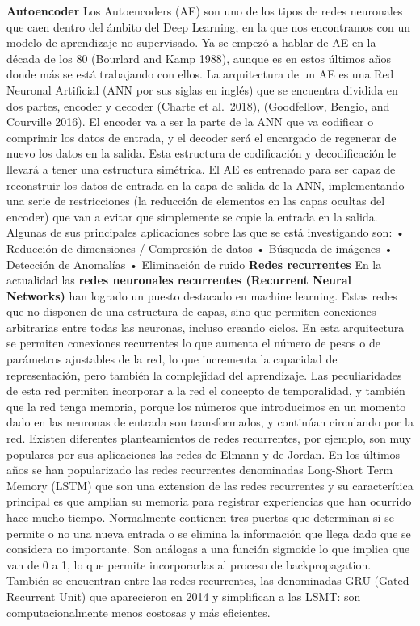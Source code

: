 \documentclass[
  a4paper,
  DIV=11,
  numbers=noendperiod]{scrreprt}
\begin{document}
\textbf{Autoencoder} Los Autoencoders (AE) son uno de los tipos de redes
neuronales que caen dentro del ámbito del Deep Learning, en la que nos
encontramos con un modelo de aprendizaje no supervisado. Ya se empezó a
hablar de AE en la década de los 80 (Bourlard and Kamp 1988), aunque es
en estos últimos años donde más se está trabajando con ellos. La
arquitectura de un AE es una Red Neuronal Artificial (ANN por sus siglas
en inglés) que se encuentra dividida en dos partes, encoder y decoder
(Charte et al.~2018), (Goodfellow, Bengio, and Courville 2016). El
encoder va a ser la parte de la ANN que va codificar o comprimir los
datos de entrada, y el decoder será el encargado de regenerar de nuevo
los datos en la salida. Esta estructura de codificación y decodificación
le llevará a tener una estructura simétrica. El AE es entrenado para ser
capaz de reconstruir los datos de entrada en la capa de salida de la
ANN, implementando una serie de restricciones (la reducción de elementos
en las capas ocultas del encoder) que van a evitar que simplemente se
copie la entrada en la salida. Algunas de sus principales aplicaciones
sobre las que se está investigando son: • Reducción de dimensiones /
Compresión de datos • Búsqueda de imágenes • Detección de Anomalías •
Eliminación de ruido \textbf{Redes recurrentes} En la actualidad las
\textbf{redes neuronales recurrentes (Recurrent Neural Networks)} han
logrado un puesto destacado en machine learning. Estas redes que no
disponen de una estructura de capas, sino que permiten conexiones
arbitrarias entre todas las neuronas, incluso creando ciclos. En esta
arquitectura se permiten conexiones recurrentes lo que aumenta el número
de pesos o de parámetros ajustables de la red, lo que incrementa la
capacidad de representación, pero también la complejidad del
aprendizaje. Las peculiaridades de esta red permiten incorporar a la red
el concepto de temporalidad, y también que la red tenga memoria, porque
los números que introducimos en un momento dado en las neuronas de
entrada son transformados, y continúan circulando por la red. Existen
diferentes planteamientos de redes recurrentes, por ejemplo, son muy
populares por sus aplicaciones las redes de Elmann y de Jordan. En los
últimos años se han popularizado las redes recurrentes denominadas
Long-Short Term Memory (LSTM) que son una extension de las redes
recurrentes y su caracterítica principal es que amplian su memoria para
registrar experiencias que han ocurrido hace mucho tiempo. Normalmente
contienen tres puertas que determinan si se permite o no una nueva
entrada o se elimina la información que llega dado que se considera no
importante. Son análogas a una función sigmoide lo que implica que van
de 0 a 1, lo que permite incorporarlas al proceso de backpropagation.
También se encuentran entre las redes recurrentes, las denominadas GRU
(Gated Recurrent Unit) que aparecieron en 2014 y simplifican a las LSMT:
son computacionalmente menos costosas y más eficientes.
\end{document}

